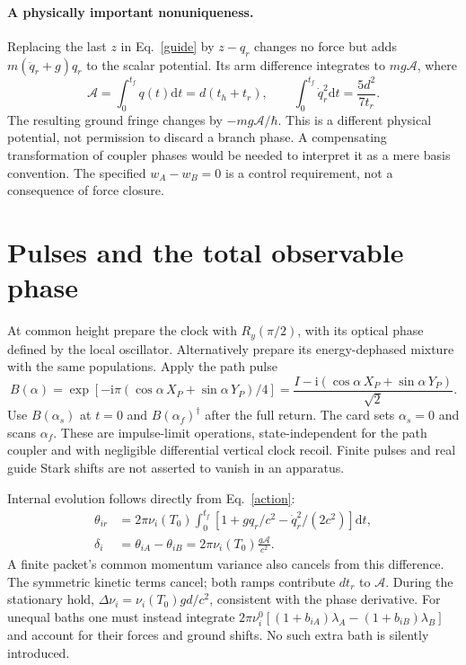 \documentclass[11pt,a4paper]{article}
\newcommand{\dd}{\mathrm d}
\newcommand{\ii}{\mathrm i}
\begin{document}
\paragraph{A physically important nonuniqueness.}
Replacing the last $z$ in Eq.~\eqref{guide} by $z-q_r$ changes no force
but adds $m(\ddot q_r+g)q_r$ to the scalar potential. Its arm difference
integrates to $mg\mathcal A$, where
\begin{equation}
 \mathcal A=\int_0^{t_f}q(t)\dd t=d(t_h+t_r),\qquad
 \int_0^{t_f}\dot q_r^2\dd t=\frac{5d^2}{7t_r}.\label{area}
\end{equation}
The resulting ground fringe changes by $-mg\mathcal A/\hbar$.
This is a different physical potential, not permission to discard a
branch phase. A compensating transformation of coupler phases would be
needed to interpret it as a mere basis convention. The specified
$w_A-w_B=0$ is a control requirement, not a consequence of force closure.

\newpage
\section{Pulses and the total observable phase}
At common height prepare the clock with $R_y(\pi/2)$, with its optical
phase defined by the local oscillator. Alternatively prepare its
energy-dephased mixture with the same populations. Apply the path pulse
\begin{equation}
 B(\alpha)=\exp[-\ii\pi(\cos\alpha\,X_P+\sin\alpha\,Y_P)/4]
           =\frac{I-\ii(\cos\alpha\,X_P+\sin\alpha\,Y_P)}{\sqrt2} .
\end{equation}
Use $B(\alpha_s)$ at $t=0$ and $B(\alpha_f)^\dagger$ after the full
return. The card sets $\alpha_s=0$ and scans $\alpha_f$. These are
impulse-limit operations, state-independent for the path coupler and
with negligible differential vertical clock recoil. Finite pulses and
real guide Stark shifts are not asserted to vanish in an apparatus.

Internal evolution follows directly from Eq.~\eqref{action}:
\begin{align}
 \theta_{ir}&=2\pi\nu_i(T_0)\int_0^{t_f}
      [1+gq_r/c^2-\dot q_r^2/(2c^2)]\dd t,\\
 \delta_i&=\theta_{iA}-\theta_{iB}
      =2\pi\nu_i(T_0)\frac{g\mathcal A}{c^2}.\label{delta}
\end{align}
A finite packet's common momentum variance also cancels from this
difference. The symmetric kinetic terms cancel; both ramps contribute
$dt_r$ to $\mathcal A$. During the stationary hold,
$\Delta\nu_i=\nu_i(T_0)gd/c^2$, consistent with the phase derivative.
For unequal baths one must instead integrate
$2\pi\nu_i^0[(1+b_{iA})\lambda_A-(1+b_{iB})\lambda_B]$ and account for
their forces and ground shifts. No such extra bath is silently introduced.
\end{document}
